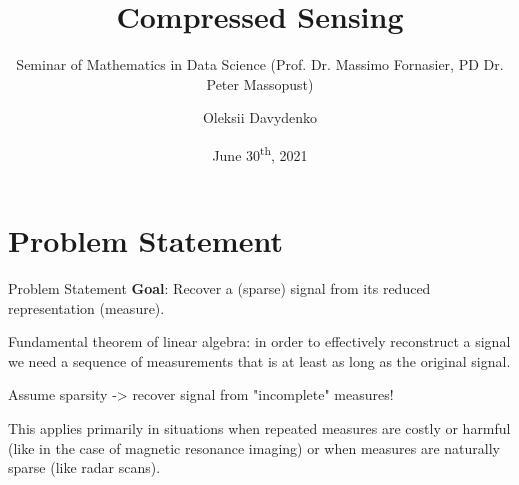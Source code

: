 \documentclass[
  english,            %
  aspectratio=169,    %
]{tumbeamer}
\title{Compressed Sensing}
\subtitle{Seminar of Mathematics in Data Science \newline (Prof. Dr. Massimo Fornasier, PD Dr. Peter Massopust) }
\author{Oleksii Davydenko}
\institute{\theChairName\\\theDepartmentName\\\theUniversityName}
\date[30/06/2021]{June 30\textsuperscript{th}, 2021}
\begin{document}
\maketitle

\section{Problem Statement}

\begin{frame}{Problem Statement}{}
  \textbf{Goal}: Recover a (sparse) signal from its reduced representation (measure).
  
  \bigskip Fundamental theorem of linear algebra: in order to effectively reconstruct a signal we need a sequence of measurements that is at least as long as the original signal.
  
  \bigskip Assume sparsity -> recover signal from "incomplete" measures!
  
  \bigskip This applies primarily in situations when repeated measures are costly or harmful (like in the case of magnetic resonance imaging) or when measures are naturally sparse (like radar scans).
  
\end{frame}
\end{document}
